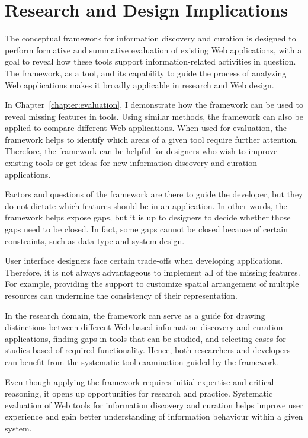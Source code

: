 \chapter{Research and Design Implications}
\label{chapter:implications}

The conceptual framework for information discovery and curation is designed to perform formative and summative evaluation of existing Web applications, with a goal to reveal how these tools support information-related activities in question. The framework, as a tool, and its capability to guide the process of analyzing Web applications makes it broadly applicable in research and Web design. 

In Chapter~\ref{chapter:evaluation}, I demonstrate how the framework can be used to reveal missing features in tools. Using similar methods, the framework can also be applied to compare different Web applications. When used for evaluation, the framework helps to identify which areas of a given tool require further attention. Therefore, the framework can be helpful for designers who wish to improve existing tools or get ideas for new information discovery and curation applications. 

Factors and questions of the framework are there to guide the developer, but they do not dictate which features should be in an application. In other words, the framework helps expose gaps, but it is up to designers to decide whether those gaps need to be closed. In fact, some gaps cannot be closed because of certain constraints, such as data type and system design.

User interface designers face certain trade-offs when developing applications. Therefore, it is not always advantageous to implement all of the missing features. For example, providing the support to customize spatial arrangement of multiple resources can undermine the consistency of their representation. 

\pagebreak

In the research domain, the framework can serve as a guide for drawing distinctions between different Web-based information discovery and curation applications, finding gaps in tools that can be studied, and selecting cases for studies based of required functionality. Hence, both researchers and developers can benefit from the systematic tool examination guided by the framework.

Even though applying the framework requires initial expertise and critical reasoning, it opens up opportunities for research and practice. Systematic evaluation of Web tools for information discovery and curation helps improve user experience and gain better understanding of information behaviour within a given system. 




